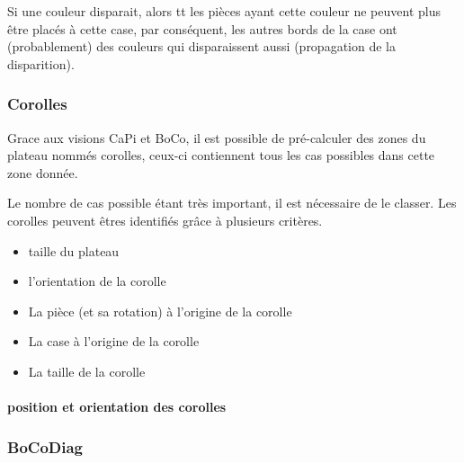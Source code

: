 	\begin{exmp}
		Si une couleur disparait, alors tt les pièces ayant cette couleur ne peuvent plus être placés à cette case, par conséquent, les autres bords de la case ont (probablement) des couleurs qui disparaissent aussi (propagation de la disparition).
	\end{exmp}

	\subsubsection{Corolles}

	Grace aux visions CaPi et BoCo, il est possible de pré-calculer des zones du plateau nommés corolles, ceux-ci contiennent tous les cas possibles dans cette zone donnée.

	Le nombre de cas possible étant très important, il est nécessaire de le classer. Les corolles peuvent êtres identifiés grâce à plusieurs critères.

	\begin{itemize}
		\item taille du plateau
		\item l'orientation de la corolle
		\item La pièce (et sa rotation) à l'origine de la corolle
		\item La case à l'origine de la corolle
		\item La taille de la corolle
	\end{itemize}

	\paragraph{position et orientation des corolles}

	\subsubsection{BoCoDiag}